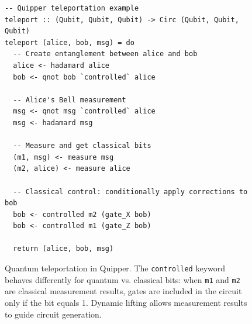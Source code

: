 \begin{figure}[t]
\begin{verbatim}
-- Quipper teleportation example
teleport :: (Qubit, Qubit, Qubit) -> Circ (Qubit, Qubit, Qubit)
teleport (alice, bob, msg) = do
  -- Create entanglement between alice and bob
  alice <- hadamard alice
  bob <- qnot bob `controlled` alice
  
  -- Alice's Bell measurement
  msg <- qnot msg `controlled` alice
  msg <- hadamard msg
  
  -- Measure and get classical bits
  (m1, msg) <- measure msg
  (m2, alice) <- measure alice
  
  -- Classical control: conditionally apply corrections to bob
  bob <- controlled m2 (gate_X bob)
  bob <- controlled m1 (gate_Z bob)
  
  return (alice, bob, msg)
\end{verbatim}
\caption{Quantum teleportation in Quipper. The \texttt{controlled} keyword behaves differently for quantum vs. classical bits: when \texttt{m1} and \texttt{m2} are classical measurement results, gates are included in the circuit only if the bit equals 1. Dynamic lifting allows measurement results to guide circuit generation.}
\label{fig:quipper-teleport}
\end{figure}
